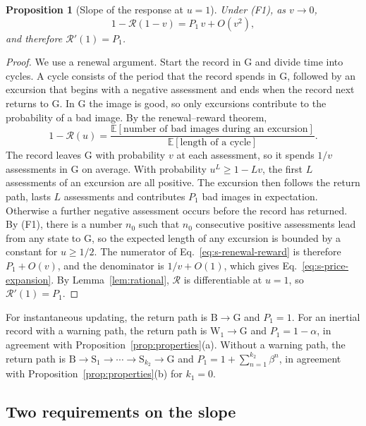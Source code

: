 \documentclass[10pt]{wlscirep}
\newcommand{\Rmap}{\mathscr{R}}            %
\newcommand{\st}[1]{\mathrm{#1}}           %
\newcommand{\Pone}{P_{1}}                  %
\theoremstyle{plain}
\newtheorem{proposition}[lemma]{Proposition}
\theoremstyle{remark}
\begin{document}
\begin{proposition}[Slope of the response at $u=1$]\label{prop:price}
Under (F1), as $v\to0$,
\begin{equation}
1-\Rmap(1-v)=\Pone\,v+O(v^2),
\label{eq:s-price-expansion}
\end{equation}
and therefore $\Rmap'(1)=\Pone$.
\end{proposition}
\begin{proof}
We use a renewal argument. Start the record in $\st G$ and divide time into cycles. A cycle consists of the period that the record spends in $\st G$, followed by an excursion that begins with a negative assessment and ends when the record next returns to $\st G$. In $\st G$ the image is good, so only excursions contribute to the probability of a bad image. By the renewal--reward theorem,
\begin{equation}
1-\Rmap(u)=\frac{\mathbb E[\text{number of bad images during an excursion}]}{\mathbb E[\text{length of a cycle}]}.
\label{eq:s-renewal-reward}
\end{equation}
The record leaves $\st G$ with probability $v$ at each assessment, so it spends $1/v$ assessments in $\st G$ on average. With probability $u^{L}\geq1-Lv$, the first $L$ assessments of an excursion are all positive. The excursion then follows the return path, lasts $L$ assessments and contributes $\Pone$ bad images in expectation. Otherwise a further negative assessment occurs before the record has returned. By (F1), there is a number $n_0$ such that $n_0$ consecutive positive assessments lead from any state to $\st G$, so the expected length of any excursion is bounded by a constant for $u\geq1/2$. The numerator of Eq.~\eqref{eq:s-renewal-reward} is therefore $\Pone+O(v)$, and the denominator is $1/v+O(1)$, which gives Eq.~\eqref{eq:s-price-expansion}. By Lemma~\ref{lem:rational}, $\Rmap$ is differentiable at $u=1$, so $\Rmap'(1)=\Pone$.
\end{proof}

For instantaneous updating, the return path is $\st B\to\st G$ and $\Pone=1$. For an inertial record with a warning path, the return path is $\st W_1\to\st G$ and $\Pone=1-\alpha$, in agreement with Proposition~\ref{prop:properties}(a). Without a warning path, the return path is $\st B\to\st S_1\to\cdots\to\st S_{k_2}\to\st G$ and $\Pone=1+\sum_{n=1}^{k_2}\beta^n$, in agreement with Proposition~\ref{prop:properties}(b) for $k_1=0$.

\subsection{Two requirements on the slope}
\end{document}
